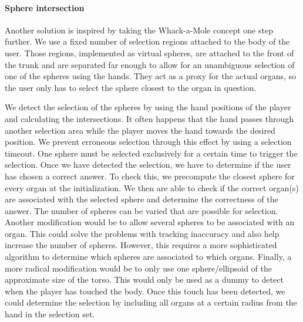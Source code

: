 \paragraph{Sphere intersection}
Another solution is inspired by taking the Whack-a-Mole concept one step further. We use a fixed number of selection regions attached to the body of the user. Those regions, implemented as virtual spheres, are attached to the front of the trunk and are separated far enough to allow for an unambiguous selection of one of the spheres using the hands. They act as a proxy for the actual organs, so the user only has to select the sphere closest to the organ in question.

We detect the selection of the spheres by using the hand positions of the player and calculating the intersections. It often happens that the hand passes through another selection area while the player moves the hand towards the desired position. We prevent erroneous selection through this effect by using a selection timeout. One sphere must be selected exclusively for a certain time to trigger the selection.
Once we have detected the selection, we have to determine if the user has chosen a correct answer. To check this, we precompute the closest sphere for every organ at the initialization. We then are able to check if the correct organ(s) are associated with the selected sphere and determine the correctness of the answer.
The number of spheres can be varied that are possible for selection. 
Another modification would be to allow several spheres to be associated with an organ. This could solve the problems with tracking inaccuracy and also help increase the number of spheres. However, this requires a more sophisticated algorithm to determine which spheres are associated to which organs.
Finally, a more radical modification would be to only use one sphere/ellipsoid of the approximate size of the torso. This would only be used as a dummy to detect when the player has touched the body. Once this touch has been detected, we could determine the selection by including all organs at a certain radius from the hand in the selection set. 

